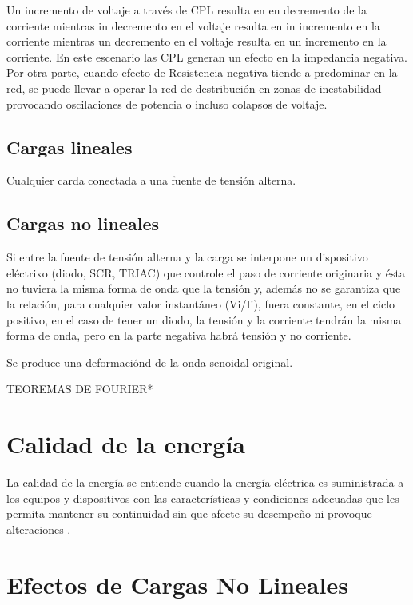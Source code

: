 \documentclass[]{article}
\begin{document}
Un incremento de voltaje a través de CPL resulta en en decremento de la corriente mientras in decremento en el voltaje resulta en in incremento en la corriente mientras un decremento en el voltaje resulta en un incremento en la corriente. En este escenario las CPL generan un efecto en la impedancia negativa.\\

Por otra parte, cuando efecto de Resistencia negativa tiende a predominar en la red, se puede llevar a operar la red de destribución en zonas de inestabilidad provocando oscilaciones de potencia o incluso colapsos de voltaje.\\

\subsection{Cargas lineales}

Cualquier carda conectada a una fuente de tensión alterna.\\

\subsection{Cargas no lineales}

Si entre la fuente de tensión alterna y la carga se interpone un dispositivo eléctrixo (diodo, SCR, TRIAC) que controle el paso de corriente originaria y ésta no tuviera la misma forma de onda que la tensión y, además no se garantiza que la relación, 
para cualquier valor instantáneo (Vi/Ii), fuera constante, en el ciclo positivo, en el caso de tener un diodo, la tensión y la corriente tendrán la misma forma de onda,
pero en la parte negativa habrá tensión y no corriente.

Se produce una deformaciónd de la onda senoidal original.

TEOREMAS DE FOURIER*



\section{Calidad de la energía}

La calidad de la energía se entiende cuando la energía eléctrica es suministrada a los equipos y dispositivos con las características y condiciones adecuadas que les permita mantener su continuidad sin que afecte su desempeño ni provoque alteraciones .\\

\section{Efectos de Cargas No Lineales}
\end{document}
